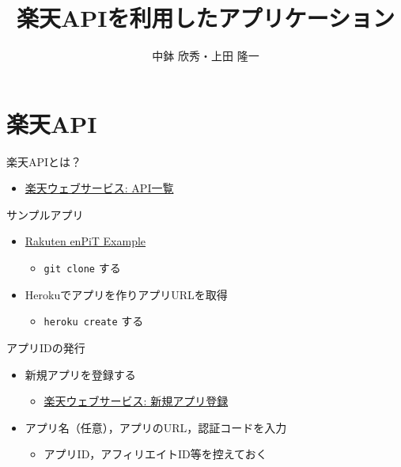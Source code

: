 \documentclass[t]{beamer}
\institute[AIIT]{産業技術大学院大学(AIIT)}
\author{中鉢 欣秀・上田 隆一}
\date{}
\title{楽天APIを利用したアプリケーション}
\begin{document}
\maketitle

\section{楽天API}
\label{sec-1}
\begin{frame}[label=sec-1-1]{楽天APIとは？}
\begin{itemize}
\item \href{http://webservice.rakuten.co.jp/document/}{楽天ウェブサービス: API一覧}
\end{itemize}
\end{frame}

\begin{frame}[fragile,label=sec-1-2]{サンプルアプリ}
 \begin{itemize}
\item \href{https://github.com/ryuichiueda/rakuten_enpit_example}{Rakuten enPiT Example}
\begin{itemize}
\item \texttt{git clone} する
\end{itemize}
\item Herokuでアプリを作りアプリURLを取得
\begin{itemize}
\item \texttt{heroku create} する
\end{itemize}
\end{itemize}
\end{frame}

\begin{frame}[label=sec-1-3]{アプリIDの発行}
\begin{itemize}
\item 新規アプリを登録する
\begin{itemize}
\item \href{https://webservice.rakuten.co.jp/app/create}{楽天ウェブサービス: 新規アプリ登録}
\end{itemize}
\item アプリ名（任意），アプリのURL，認証コードを入力
\begin{itemize}
\item アプリID，アフィリエイトID等を控えておく
\end{itemize}
\end{itemize}
\end{frame}
\end{document}
